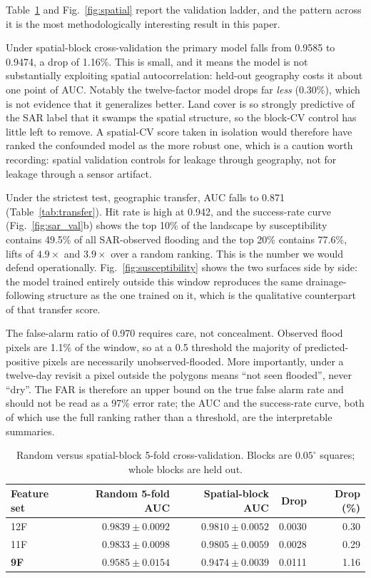 \documentclass[10pt,twocolumn]{article}
\begin{document}
Table~\ref{tab:spatial} and Fig.~\ref{fig:spatial} report the validation
ladder, and the pattern across it is the most methodologically interesting result
in this paper.

Under spatial-block cross-validation the primary model falls from 0.9585 to
0.9474, a drop of 1.16\%. This is small, and it means the model is not
substantially exploiting spatial autocorrelation: held-out geography costs it
about one point of AUC. Notably the twelve-factor model drops far \emph{less}
(0.30\%), which is not evidence that it generalizes better. Land cover is so
strongly predictive of the SAR label that it swamps the spatial structure, so the
block-CV control has little left to remove. A spatial-CV score taken in isolation
would therefore have ranked the confounded model as the more robust one, which is
a caution worth recording: spatial validation controls for leakage through
geography, not for leakage through a sensor artifact.

Under the strictest test, geographic transfer, AUC falls to 0.871
(Table~\ref{tab:transfer}). Hit rate is high at 0.942, and the success-rate curve
(Fig.~\ref{fig:sar_val}b) shows the top 10\% of the landscape by susceptibility
contains 49.5\% of all SAR-observed flooding and the top 20\% contains 77.6\%,
lifts of $4.9\times$ and $3.9\times$ over a random ranking. This is the number we
would defend operationally. Fig.~\ref{fig:susceptibility} shows the two
surfaces side by side: the model trained entirely outside this window
reproduces the same drainage-following structure as the one trained on it,
which is the qualitative counterpart of that transfer score.

The false-alarm ratio of 0.970 requires care, not concealment. Observed
flood pixels are 1.1\% of the window, so at a 0.5 threshold the majority of
predicted-positive pixels are necessarily unobserved-flooded. More importantly,
under a twelve-day revisit a pixel outside the polygons means ``not seen
flooded'', never ``dry''. The FAR is therefore an upper bound on the true false
alarm rate and should not be read as a 97\% error rate; the AUC and the
success-rate curve, both of which use the full ranking rather than a threshold,
are the interpretable summaries.

\begin{table}[!t]
\centering\footnotesize
\caption{Random versus spatial-block 5-fold cross-validation. Blocks are
$0.05^\circ$ squares; whole blocks are held out.}
\label{tab:spatial}
\small
\begin{tabular}{@{}lrrrr@{}}
\toprule
\textbf{Feature set} & \textbf{Random 5-fold AUC} & \textbf{Spatial-block AUC} &
\textbf{Drop} & \textbf{Drop (\%)} \\
\midrule
12F & $0.9839\pm0.0092$ & $0.9810\pm0.0052$ & 0.0030 & 0.30 \\
11F & $0.9833\pm0.0098$ & $0.9805\pm0.0059$ & 0.0028 & 0.29 \\
\textbf{9F} & $0.9585\pm0.0154$ & $0.9474\pm0.0039$ & 0.0111 & 1.16 \\
\bottomrule
\end{tabular}
\end{table}
\end{document}
